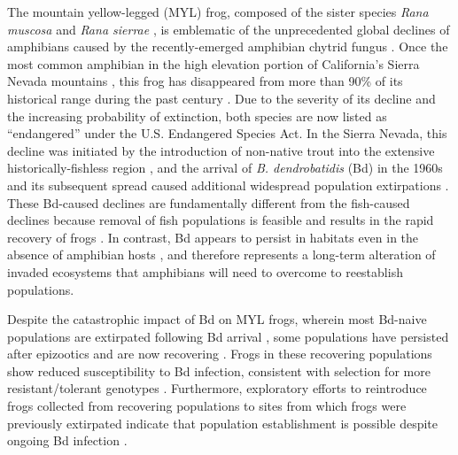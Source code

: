 \documentclass[9pt,twocolumn,twoside,lineno]{pnas-new}
\begin{document}
The mountain yellow-legged (MYL) frog, composed of the sister species
\emph{Rana muscosa} and \emph{Rana sierrae} \citep{vredenburg2007}, is
emblematic of the unprecedented global declines of amphibians caused by
the recently-emerged amphibian chytrid fungus
\citep[\emph{Batrachochytrium dendrobatidis,}][]{scheele2019}. Once the
most common amphibian in the high elevation portion of California's
Sierra Nevada mountains \citep[USA,][]{grinnell1924}, this frog has
disappeared from more than 90\% of its historical range during the past
century \citep{vredenburg2007}. Due to the severity of its decline and
the increasing probability of extinction, both species are now listed as
``endangered'' under the U.S. Endangered Species Act. In the Sierra
Nevada, this decline was initiated by the introduction of non-native
trout into the extensive historically-fishless region
\citep{bradford1989, knapp2000}, and the arrival of \emph{B.
dendrobatidis} (Bd) in the 1960s and its subsequent spread
\citep{vredenburg2019} caused additional widespread population
extirpations \citep{vredenburg2010, rachowicz2006}. These Bd-caused
declines are fundamentally different from the fish-caused declines
because removal of fish populations is feasible and results in the rapid
recovery of frogs \citep{knapp2007, vredenburg2004}. In contrast, Bd
appears to persist in habitats even in the absence of amphibian hosts
\citep{walker2007}, and therefore represents a long-term alteration of
invaded ecosystems that amphibians will need to overcome to reestablish
populations.

Despite the catastrophic impact of Bd on MYL frogs, wherein most
Bd-naive populations are extirpated following Bd arrival
\citep{vredenburg2010}, some populations have persisted after epizootics
\citep{briggs2010} and are now recovering \citep{knapp2016}. Frogs in
these recovering populations show reduced susceptibility to Bd
infection, consistent with selection for more resistant/tolerant
genotypes \citep{knapp2016}. Furthermore, exploratory efforts to
reintroduce frogs collected from recovering populations to sites from
which frogs were previously extirpated indicate that population
establishment is possible despite ongoing Bd infection
\citep{joseph2018}.
\end{document}
